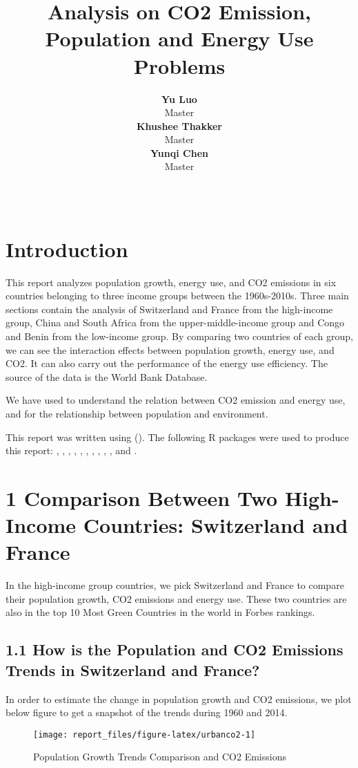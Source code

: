 \documentclass[11pt,a4paper,]{article}
\title{Analysis on CO2 Emission, Population and Energy Use Problems}
\author{\sf\Large\textbf{ Yu Luo}\\ {\sf\large Master\\[0.5cm]} \sf\Large\textbf{ Khushee Thakker}\\ {\sf\large Master\\[0.5cm]} \sf\Large\textbf{ Yunqi Chen}\\ {\sf\large Master\\[0.5cm]}}
\date{\sf\Date~\Month~\Year}
\makeatletter
\def\titlepage{\front{\expandafter{\@title}}{\@author}{\@organization}}
\makeatother
\begin{document}
\titlepage

\section*{Introduction}

This report analyzes population growth, energy use, and CO2 emissions in six countries belonging to three income groups between the 1960s-2010s. Three main sections contain the analysis of Switzerland and France from the high-income group, China and South Africa from the upper-middle-income group and Congo and Benin from the low-income group. By comparing two countries of each group, we can see the interaction effects between population growth, energy use, and CO2. It can also carry out the performance of the energy use efficiency. The source of the data is the World Bank Database.

We have used \textcite{AJMI2015629} to understand the relation between CO2 emission and energy use, and for the relationship between population and environment.

This report was written using (\textcite{R}). The following R packages were used to produce this report: \textcite{tidyverse}, \textcite{readr}, \textcite{kableExtra}, \textcite{bookdown}, \textcite{ggplot2}, \textcite{ggpubr}, \textcite{plotly}, \textcite{data}, \textcite{tidyr}, \textcite{formattable}, \textcite{stringr} and \textcite{scales}.

\section*{1 Comparison Between Two High-Income Countries: Switzerland and France}

In the high-income group countries, we pick Switzerland and France to compare their population growth, CO2 emissions and energy use. These two countries are also in the top 10 Most Green Countries in the world in Forbes rankings.

\subsection*{1.1 How is the Population and CO2 Emissions Trends in Switzerland and France?}

In order to estimate the change in population growth and CO2 emissions, we plot below figure to get a snapshot of the trends during 1960 and 2014.

\begin{figure}[!h]

{\centering \texttt{[image: report\_files/figure-latex/urbanco2-1]} 

}

\caption{Population Growth Trends Comparison and CO2 Emissions}\label{fig:urbanco2}
\end{figure}
\end{document}
